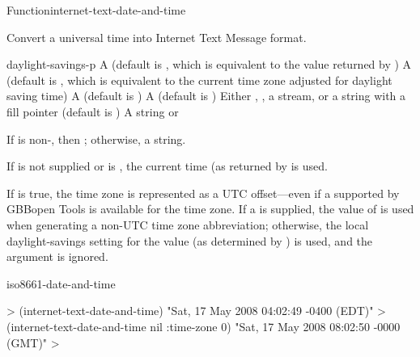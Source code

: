 \documentclass[10pt,twoside,english,pdftex]{article}
\begin{document}

\begin{functiondoc}{Function}{internet-text-date-and-time}{%
      
      
   \returns{} }
% 

\fnsyntax

\fnpurpose Convert a universal time into Internet Text Message format.

\fnpackage {}

\fnmodule {}

\fnargs
\begin{args}{daylight-savings-p}
 A  (default is \nil,
  which is equivalent to the value returned by
  )
 A  (default is \nil,
  which is equivalent to the current time zone adjusted for daylight
  saving time)
 A  (default is \nil)         A  (default is \nil)
\arg[destination] Either \nil, , a stream, or a string with a fill 
pointer (default is \nil)
\arg[result] A string or \nil{}
\end{args}

\fnreturns If  is non-\nil, then \nil; otherwise, a string.

\fndescription
{}%
%
If  is not supplied or is \nil, the current time
(as returned by  is used.

\W{} 
%
If  is true, the time zone is represented as a UTC
offset---even if a  supported by
GBBopen Tools is available for the time zone. If a  is
supplied, the value of  is used when
generating a non-UTC time zone abbreviation; otherwise, the local
daylight-savings setting for the  value (as
determined by ) is used, and the
 argument is ignored.

\begin{alsos}{iso8661-date-and-time}
\end{alsos}

\fnexamples
%
\W\supp
\begin{example}
  > (internet-text-date-and-time)
  "Sat, 17 May 2008 04:02:49 -0400 (EDT)"
  > (internet-text-date-and-time nil :time-zone 0)
  "Sat, 17 May 2008 08:02:50 -0000 (GMT)"
  >
\end{example}

\end{functiondoc}
\end{document}
